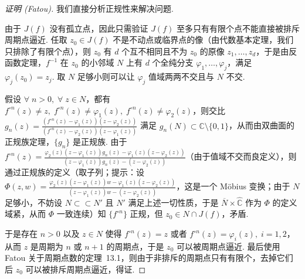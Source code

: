 \documentclass[11pt, a4paper, oneside]{ctexart}
\newcommand{\C}{\mathbb{C}}
\begin{document}
    \begin{proof}[证明 (Fatou)]
        我们直接分析正规性来解决问题.

        由于 $J(f)$ 没有孤立点，因此只需验证 $J(f)$ 至多只有有限个点不能直接被排斥周期点逼近. 任取 $z_0\in J(f)$ 不是不动点或临界点的像（由代数基本定理，我们只排除了有限个点），则 $z_0$ 有 $d$ 个互不相同且不为 $z_0$ 的原像 $z_1,\ldots,z_d$，于是由反函数定理，$f^{-1}$ 在 $z_0$ 的小邻域 $N$ 上有 $d$ 个全纯分支 $\varphi_1,\ldots,\varphi_j$，满足 $\varphi_j(z_0)=z_j$. 取 $N$ 足够小则可以让 $\varphi_j$ 值域两两不交且与 $N$ 不交.

        假设 $\forall\; n>0,\;\forall\; z\in N$，都有 $f^{\circ n}(z)\neq z,\; f^{\circ n}(z)\neq\varphi_1(z),\; f^{\circ n}(z)\neq\varphi_2(z)$，则交比 $g_n(z)=\frac{(f^{\circ n}(z)-\varphi_1(z))(z-\varphi_2(z))}{(f^{\circ n}(z)-\varphi_2(z))(z-\varphi_1(z))}$ 满足 $g_n(N)\subset \C\setminus\{0,1\}$，从而由双曲面的正规族定理，$\{g_n\}$ 是正规族. 由于 $f^{\circ n}(z)=\frac{\varphi_2(z)(z-\varphi_1(z))g_n(z)-\varphi_1(z)(z-\varphi_2(z))}{(z-\varphi_1(z))g_n(z)-(z-\varphi_2(z))}$（由于值域不交而良定义），则通过正规族的定义（取子列；提示：设 $\Phi(z,w)=\frac{\varphi_2(z)(z-\varphi_1(z))w-\varphi_1(z)(z-\varphi_2(z))}{(z-\varphi_1(z))w-(z-\varphi_2(z))}$，这是一个 Möbius 变换；由于 $N$ 足够小，不妨设 $N\subset\subset N'$ 且 $N'$ 满足上述一切性质，于是 $\overline{N}\times\hat{\C}$ 作为 $\Phi$ 的定义域紧，从而 $\Phi$ 一致连续）知 $\{f^{\circ n}\}$ 正规，但 $z_0\in N\cap J(f)$，矛盾.

        于是存在 $n>0$ 以及 $z\in N$ 使得 $f^{\circ n}(z)=z$ 或者 $f^{\circ n}(z)=\varphi_i(z),\; i=1,2$，从而 $z$ 是周期为 $n$ 或 $n+1$ 的周期点，于是 $z_0$ 可以被周期点逼近. 最后使用 Fatou 关于周期点数的定理~13.1，则由于非排斥的周期点只有有限个，去掉它们后 $z_0$ 可以被排斥周期点逼近，得证.
    \end{proof}
\end{document}
